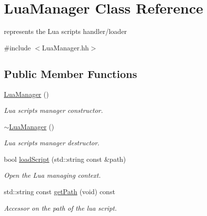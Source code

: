 \hypertarget{classLuaManager}{}\section{Lua\+Manager Class Reference}
\label{classLuaManager}


represents the Lua scripts handler/loader  




{\ttfamily \#include $<$Lua\+Manager.\+hh$>$}

\subsection*{Public Member Functions}
\begin{DoxyCompactItemize}
\item 
\mbox{\label{classLuaManager_a11da08140b20bfb4e77ac117a6bc7a0a}} 
\hyperlink{classLuaManager_a11da08140b20bfb4e77ac117a6bc7a0a}{Lua\+Manager} ()
\begin{DoxyCompactList}\small\item\em Lua scripts manager constructor. \end{DoxyCompactList}\item 
\mbox{\label{classLuaManager_a26a821d05088bb1a6d7642b6312930aa}} 
\hyperlink{classLuaManager_a26a821d05088bb1a6d7642b6312930aa}{$\sim$\+Lua\+Manager} ()
\begin{DoxyCompactList}\small\item\em Lua scripts manager destructor. \end{DoxyCompactList}\item 
bool \hyperlink{classLuaManager_a113433dbaed2e770ed510610de8b6c4f}{load\+Script} (std\+::string const \&path)
\begin{DoxyCompactList}\small\item\em Open the Lua managing context. \end{DoxyCompactList}\item 
\mbox{\label{classLuaManager_a75a90a4ec9cfa390c044be3ea1ee9377}} 
std\+::string const \hyperlink{classLuaManager_a75a90a4ec9cfa390c044be3ea1ee9377}{get\+Path} (void) const
\begin{DoxyCompactList}\small\item\em Accessor on the path of the lua script. \end{DoxyCompactList}\item 

\end{DoxyCompactItemize}
